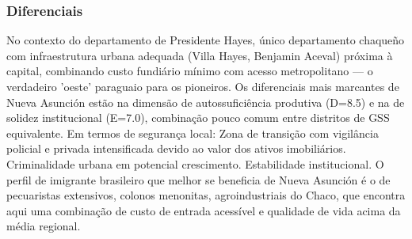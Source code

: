 \subsubsection*{Diferenciais}\label{dif-nueva-asuncion-1511}
No contexto do departamento de Presidente Hayes, único departamento chaqueño com infraestrutura urbana adequada (Villa Hayes, Benjamin Aceval) próxima à capital, combinando custo fundiário mínimo com acesso metropolitano — o verdadeiro 'oeste' paraguaio para os pioneiros. Os diferenciais mais marcantes de Nueva Asunción estão na dimensão de autossuficiência produtiva (D=8.5) e na de solidez institucional (E=7.0), combinação pouco comum entre distritos de GSS equivalente. Em termos de segurança local: Zona de transição com vigilância policial e privada intensificada devido ao valor dos ativos imobiliários. Criminalidade urbana em potencial crescimento. Estabilidade institucional. O perfil de imigrante brasileiro que melhor se beneficia de Nueva Asunción é o de pecuaristas extensivos, colonos menonitas, agroindustriais do Chaco, que encontra aqui uma combinação de custo de entrada acessível e qualidade de vida acima da média regional.
